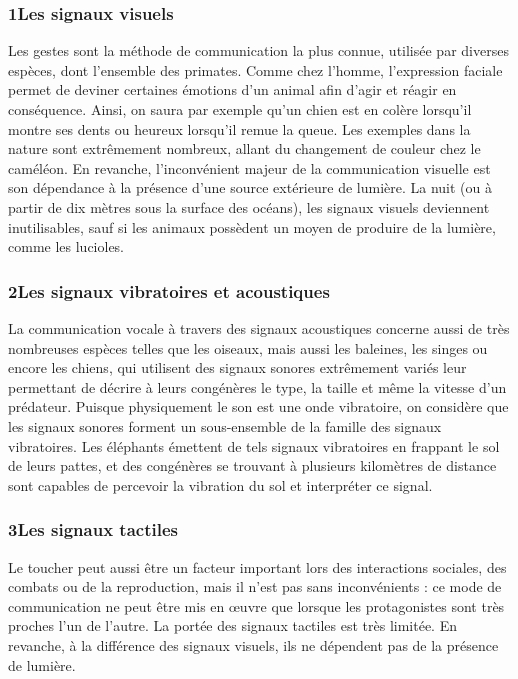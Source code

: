 \subsubsection*{1\quad Les signaux visuels}
Les gestes sont la méthode de communication la plus connue, utilisée par diverses espèces, dont l’ensemble des primates. Comme chez l’homme, l’expression faciale permet de deviner certaines émotions d’un animal afin d’agir et réagir en conséquence. Ainsi, on saura par exemple qu’un chien est en colère lorsqu’il montre ses dents ou heureux lorsqu’il remue la queue. Les exemples dans la nature sont extrêmement nombreux, allant du changement de couleur chez le caméléon. En revanche, l’inconvénient majeur de la communication visuelle est son dépendance à la présence d’une source extérieure de lumière. La nuit (ou à partir de dix mètres sous la surface des océans), les signaux visuels deviennent inutilisables, sauf si les animaux possèdent un moyen de produire de la lumière, comme les lucioles.
\subsubsection*{2\quad Les signaux vibratoires et acoustiques}
La communication vocale à travers des signaux acoustiques concerne aussi de très nombreuses espèces telles que les oiseaux, mais aussi les baleines, les singes ou encore les chiens, qui utilisent des signaux sonores extrêmement variés leur permettant de décrire à leurs congénères le type, la taille et même la vitesse d’un prédateur. Puisque physiquement le son est une onde vibratoire, on considère que les signaux sonores forment un sous-ensemble de la famille des signaux vibratoires. Les éléphants émettent de tels signaux vibratoires en frappant le sol de leurs pattes, et des congénères se trouvant à plusieurs kilomètres de distance sont capables de percevoir la vibration du sol et interpréter ce signal.
\subsubsection*{3\quad Les signaux tactiles}
Le toucher peut aussi être un facteur important lors des interactions sociales, des combats ou de la reproduction, mais il n’est pas sans inconvénients : ce mode de communication ne peut être mis en œuvre que lorsque les protagonistes sont très proches l’un de l’autre. La portée des signaux tactiles est très limitée. En revanche, à la différence des signaux visuels, ils ne dépendent pas de la présence de lumière.
